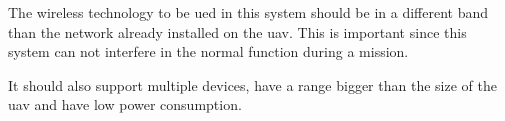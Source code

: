 The wireless technology to be ued in this system should be in a different band than the network already installed on the \gls{uav}.
This is important since this system can not interfere in the normal function during a mission.

It should also support multiple devices, have a range bigger than the size of the \gls{uav} and have low power consumption.







